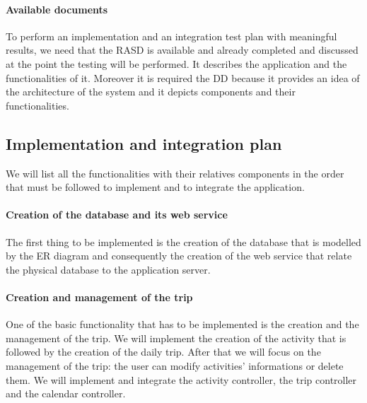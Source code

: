 \documentclass[12pt,titlepage]{article}
\begin{document}
\paragraph{Available documents}
To perform an implementation and an integration test plan with meaningful results, we need that the RASD is available and already completed and discussed at the point the testing will be performed. It describes the application and the functionalities of it.
Moreover it is required the DD because it provides an idea of the architecture of the system and it depicts components and their functionalities.
\subsection{Implementation and integration plan}
We will list all the functionalities with their relatives components in the order that must be followed to implement and to integrate the application.
\paragraph{Creation of the database and its web service}
The first thing to be implemented is the creation of the database that is modelled by the ER diagram and consequently the creation of the web service that relate the physical database to the application server.
\begin{figure}[H]
\centering
{}
\end{figure}
\paragraph{Creation and management of the trip}
One of the basic functionality that has to be implemented is the creation and the management of the trip. We will implement the creation of the activity that is followed by the creation of the daily trip. After that we will focus on the management of the trip: the user can modify activities' informations or delete them.
We will implement and integrate the activity controller, the trip controller and the calendar controller.
\begin{figure}[H]
\centering
{}
\end{figure}
\end{document}
